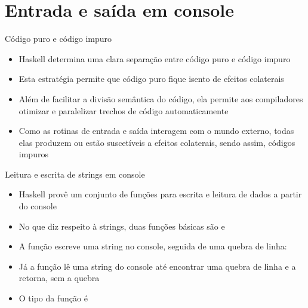 \section{Entrada e saída em console}

\begin{frame}[fragile]{Código puro e código impuro}

    \begin{itemize}
        \item Haskell determina uma clara separação entre código puro e código impuro

        \item Esta estratégia permite que código puro fique isento de efeitos colaterais

        \item Além de facilitar a divisão semântica do código, ela permite aos compiladores
            otimizar e paralelizar trechos de código automaticamente

        \item Como as rotinas de entrada e saída interagem com o mundo externo, todas elas
            produzem ou estão suscetíveis a efeitos colaterais, sendo assim, códigos impuros
    \end{itemize}

\end{frame}

\begin{frame}[fragile]{Leitura e escrita de strings em console}

    \begin{itemize}
        \item Haskell provê um conjunto de funções para escrita e leitura de dados a partir 
            do console

        \item No que diz respeito à strings, duas funções básicas são 
            e 

        \item A função  escreve uma string no console, seguida de uma
            quebra de linha:


        \item Já a função  lê uma string do console até encontrar uma 
            quebra de linha e a retorna, sem a quebra

        \item O tipo da função  é

    \end{itemize}

\end{frame}

